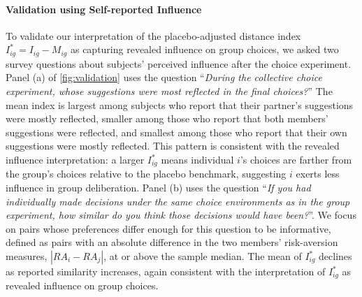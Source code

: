\documentclass[11 pt]{article}
\begin{document}
\paragraph{Validation using Self-reported Influence}\label{subsection:validation} To validate our interpretation of the placebo-adjusted distance index $I^*_{ig}=I_{ig}-M_{ig}$ as capturing revealed influence on group choices, we asked two survey questions about subjects' perceived influence after the choice experiment. Panel (a) of \autoref{fig:validation} uses the question ``\textit{During the collective choice experiment, whose suggestions were most reflected in the final choices?}'' The mean index is largest among subjects who report that their partner's suggestions were mostly reflected, smaller among those who report that both members' suggestions were reflected, and smallest among those who report that their own suggestions were mostly reflected. This pattern is consistent with the revealed influence interpretation: a larger $I^*_{ig}$ means individual $i$'s choices are farther from the group's choices relative to the placebo benchmark, suggesting $i$ exerts less influence in group deliberation. Panel (b) uses the question ``\textit{If you had individually made decisions under the same choice environments as in the group experiment, how similar do you think those decisions would have been?}''. We focus on pairs whose preferences differ enough for this question to be informative, defined as pairs with an absolute difference in the two members' risk-aversion measures, $|RA_i-RA_j|$, at or above the sample median. The mean of $I^*_{ig}$ declines as reported similarity increases, again consistent with the interpretation of $I^*_{ig}$ as revealed influence on group choices.
\end{document}
